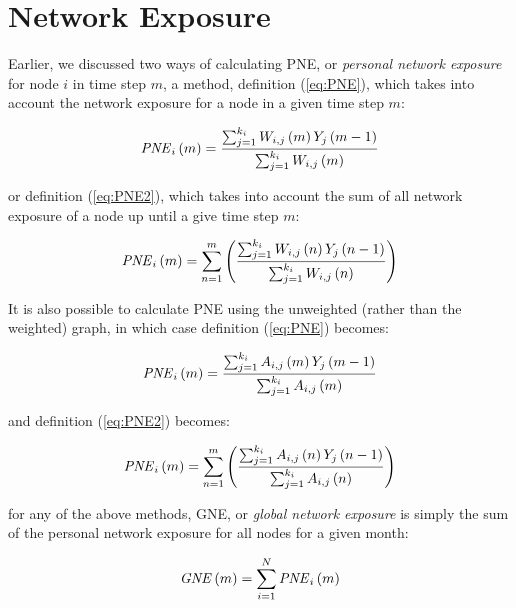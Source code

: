 \documentclass[12pt]{article}
\begin{document}
\section{Network Exposure}

Earlier, we discussed two ways of calculating PNE, or \emph{personal network exposure} for node \(i\) in time step \(m\), a method, definition (\ref{eq:PNE}), which takes into account the network exposure for a node in a given time step \(m\): 

\begin{equation}
{\it PNE}_{{i}} \left( m \right) ={\frac {\sum _{j=1}^{k_{{i}}}
 W_{{i,j}} \left( m \right) Y_{{j}} \left( m-1
 \right) }{\sum _{j=1}^{k_{{i}}}  W_{{i,j}} \left( m
 \right) }}
 \label{eq:PNE}
\end{equation}

or definition (\ref{eq:PNE2}), which takes into account the sum of all network exposure of a node up until a give time step \(m\):

\begin{equation}
{\it PNE}_{{i}} \left( m \right) = {\sum_{n=1}^m \left(  {\frac {\sum _{j=1}^{k_{{i}}}
 W_{{i,j}} \left( n \right) Y_{{j}} \left( n-1
 \right) }{\sum _{j=1}^{k_{{i}}}  W_{{i,j}} \left( n
 \right) } }\right)}
 \label{eq:PNE2}
\end{equation}

It is also possible to calculate PNE using the unweighted (rather than the weighted) graph, in which case definition (\ref{eq:PNE}) becomes:

\begin{equation}
{\it PNE}_{{i}} \left( m \right) ={\frac {\sum _{j=1}^{k_{{i}}}
 A_{{i,j}} \left( m \right) Y_{{j}} \left( m-1
 \right) }{\sum _{j=1}^{k_{{i}}}  A_{{i,j}} \left( m
 \right) }}
 \label{eq:PNEu}
\end{equation}

and definition (\ref{eq:PNE2}) becomes:

\begin{equation}
{\it PNE}_{{i}} \left( m \right) = {\sum_{n=1}^m \left(  {\frac {\sum _{j=1}^{k_{{i}}}
 A_{{i,j}} \left( n \right) Y_{{j}} \left( n-1
 \right) }{\sum _{j=1}^{k_{{i}}}  A_{{i,j}} \left( n
 \right) } }\right)}
 \label{eq:PNE2u}
\end{equation}


for any of the above methods, GNE, or \emph{global network exposure} is simply the sum of the personal network exposure for all nodes for a given month:
 
\begin{equation}
{\it GNE} \left( m \right) =\sum _{i=1}^{N}{\it PNE}_{{i}} \left( m
 \right) 
\end{equation}
\end{document}
